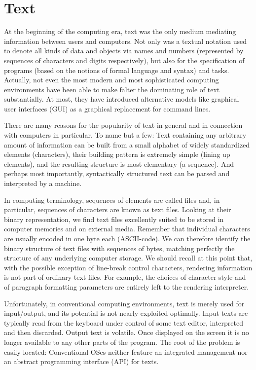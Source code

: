 \chapter{Text}
\label{ch:text}
At the beginning of the computing era, text was the only medium mediating information between
users and computers. Not only was a textual notation used to denote all kinds of data and objects
via names and numbers (represented by sequences of characters and digits respectively), but
also for the specification of programs (based on the notions of formal language and syntax) and
tasks. Actually, not even the most modern and most sophisticated computing environments have
been able to make falter the dominating role of text substantially. At most, they have introduced
alternative models like graphical user interfaces (GUI) as a graphical replacement for command
lines.

There are many reasons for the popularity of text in general and in connection with computers in
particular. To name but a few: Text containing any arbitrary amount of information can be built
from a small alphabet of widely standardized elements (characters), their building pattern is
extremely simple (lining up elements), and the resulting structure is most elementary (a
sequence). And perhaps most importantly, syntactically structured text can be parsed and
interpreted by a machine.

In computing terminology, sequences of elements are called files and, in particular, sequences of
characters are known as text files. Looking at their binary representation, we find text files
excellently suited to be stored in computer memories and on external media. Remember that
individual characters are usually encoded in one byte each (ASCII-code). We can therefore
identify the binary structure of text files with sequences of bytes, matching perfectly the structure
of any underlying computer storage. We should recall at this point that, with the possible exception
of line-break control characters, rendering information is not part of ordinary text files. For
example, the choices of character style and of paragraph formatting parameters are entirely left to
the rendering interpreter.

Unfortunately, in conventional computing environments, text is merely used for input/output, and
its potential is not nearly exploited optimally. Input texts are typically read from the keyboard under
control of some text editor, interpreted and then discarded. Output text is volatile. Once displayed
on the screen it is no longer available to any other parts of the program. The root of the problem is
easily located: Conventional OSes neither feature an integrated management nor an
abstract programming interface (API) for texts.

